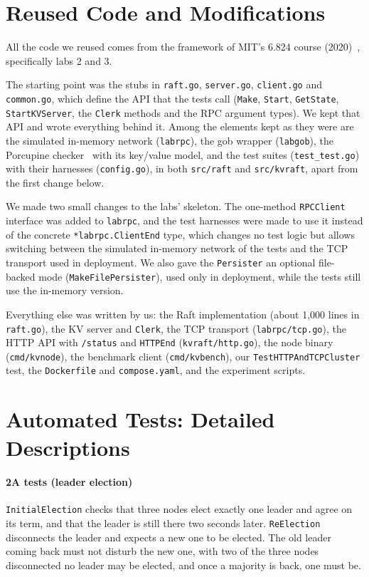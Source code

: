 \documentclass[conference]{IEEEtran}
\begin{document}
\section{Reused Code and Modifications}\label{sec:algs-reuse}
All the code we reused comes from the framework of MIT's 6.824 course (2020)~\cite{mit6824}, specifically labs 2 and 3.

The starting point was the stubs in \texttt{raft.go}, \texttt{server.go}, \texttt{client.go} and \texttt{common.go}, which define the API that the tests call (\texttt{Make}, \texttt{Start},
\texttt{GetState}, \texttt{StartKVServer}, the \texttt{Clerk} methods and the RPC argument types). We kept that API and wrote everything behind it.
Among the elements kept as they were are the simulated in-memory network (\texttt{labrpc}), the gob wrapper (\texttt{labgob}), the Porcupine checker~\cite{porcupine} with its key/value model,
and the test suites (\texttt{test\_test.go}) with their harnesses (\texttt{config.go}), in both \texttt{src/raft} and \texttt{src/kvraft}, apart from the first change below.

We made two small changes to the labs' skeleton.
The one-method \texttt{RPCClient} interface was added to \texttt{labrpc}, and the test harnesses were made to use it instead of the concrete \texttt{*labrpc.ClientEnd} type,
which changes no test logic but allows switching between the simulated in-memory network of the tests and the TCP transport used in deployment.
We also gave the \texttt{Persister} an optional file-backed mode (\texttt{MakeFilePersister}), used only in deployment, while the tests still use the in-memory version.

Everything else was written by us: the Raft implementation (about 1{,}000 lines in \texttt{raft.go}), the KV server and \texttt{Clerk}, the TCP transport (\texttt{labrpc/tcp.go}),
the HTTP API with \texttt{/status} and \texttt{HTTPEnd} (\texttt{kvraft/http.go}), the node binary (\texttt{cmd/kvnode}), the benchmark client (\texttt{cmd/kvbench}),
our \texttt{TestHTTPAndTCPCluster} test, the \texttt{Dockerfile} and \texttt{compose.yaml}, and the experiment scripts.

\section{Automated Tests: Detailed Descriptions}\label{sec:correct-tests-detail}
\paragraph{2A tests (leader election)} \texttt{InitialElection} checks that three nodes elect exactly one leader and agree on its term, and that the leader is still there two seconds later. \texttt{ReElection} disconnects the leader and expects a new one to be elected. The old leader coming back must not disturb the new one, with two of the three nodes disconnected no leader may be elected, and once a majority is back, one must be.
\end{document}
